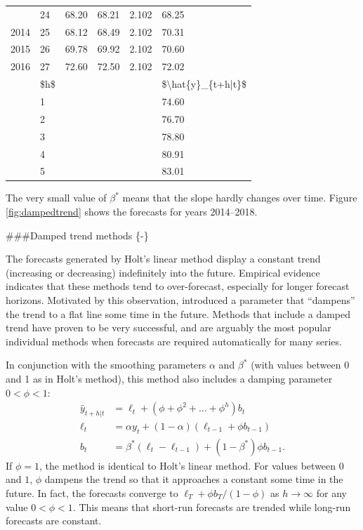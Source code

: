 \documentclass[]{book}
\begin{document}
\begin{table}[t]
\begin{tabular}{llllll}
\addlinespace
2013 & 24 & 68.20 & 68.21 & 2.102 & 68.25\\
2014 & 25 & 68.12 & 68.49 & 2.102 & 70.31\\
2015 & 26 & 69.78 & 69.92 & 2.102 & 70.60\\
2016 & 27 & 72.60 & 72.50 & 2.102 & 72.02\\
 & \$h\$ &  &  &  & \$\textbackslash{}hat\{y\}\_\{t+h|t\}\$\\
\addlinespace
 & 1 &  &  &  & 74.60\\
 & 2 &  &  &  & 76.70\\
 & 3 &  &  &  & 78.80\\
 & 4 &  &  &  & 80.91\\
 & 5 &  &  &  & 83.01\\
\bottomrule
\end{tabular}
\end{table}

The very small value of \(\beta^*\) means that the slope hardly changes over time. Figure \ref{fig:dampedtrend} shows the forecasts for years 2014--2018.

\#\#\#Damped trend methods \{-\}

The forecasts generated by Holt's linear method display a constant trend (increasing or decreasing) indefinitely into the future. Empirical evidence indicates that these methods tend to over-forecast, especially for longer forecast horizons. Motivated by this observation, \citet{GarMacK1985} introduced a parameter that ``dampens'' the trend to a flat line some time in the future. Methods that include a damped trend have proven to be very successful, and are arguably the most popular individual methods when forecasts are required automatically for many series.

In conjunction with the smoothing parameters \(\alpha\) and \(\beta^*\) (with values between 0 and 1 as in Holt's method), this method also includes a damping parameter \(0<\phi<1\):
\begin{align*}
  \hat{y}_{t+h|t} &= \ell_{t} + (\phi+\phi^2 + \dots + \phi^{h})b_{t} \\
  \ell_{t} &= \alpha y_{t} + (1 - \alpha)(\ell_{t-1} + \phi b_{t-1})\\
  b_{t} &= \beta^*(\ell_{t} - \ell_{t-1}) + (1 -\beta^*)\phi b_{t-1}.
\end{align*}
If \(\phi=1\), the method is identical to Holt's linear method. For values between \(0\) and \(1\), \(\phi\) dampens the trend so that it approaches a constant some time in the future. In fact, the forecasts converge to \(\ell_T+\phi b_T/(1-\phi)\) as \(h\rightarrow\infty\) for any value \(0<\phi<1\). This means that short-run forecasts are trended while long-run forecasts are constant.
\end{document}
